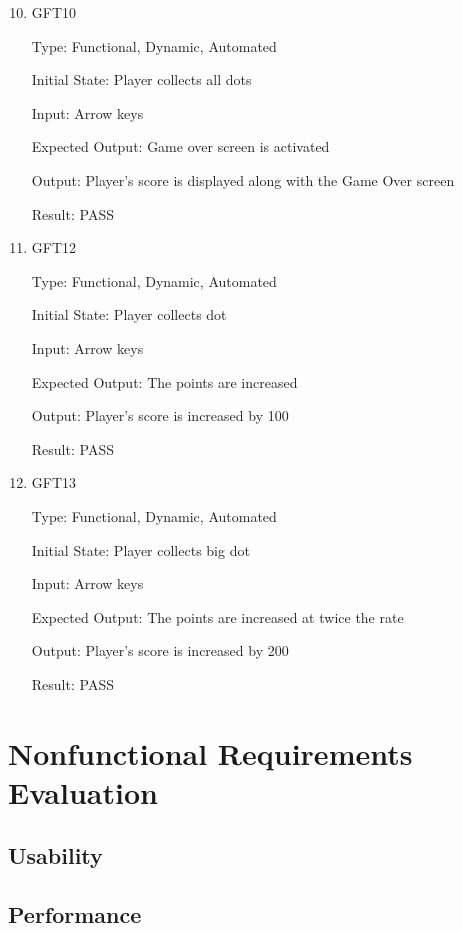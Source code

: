 \documentclass[12pt, titlepage]{article}
\begin{document}
\begin{enumerate}
\setcounter{enumi}{9}
\item{\label{gft10}{GFT10}\\}

Type: Functional, Dynamic, Automated
					
Initial State: Player collects all dots
					
Input: Arrow keys
					
Expected Output: Game over screen is activated

Output: Player's score is displayed along with the Game Over screen

Result: PASS
\setcounter{enumi}{11}
\item{\label{gft12}{GFT12}\\}

Type: Functional, Dynamic, Automated
					
Initial State: Player collects dot
					
Input: Arrow keys
					
Expected Output: The points are increased

Output: Player's score is increased by 100

Result: PASS

\item{\label{gft13}{GFT13}\\}

Type: Functional, Dynamic, Automated
					
Initial State: Player collects big dot
					
Input: Arrow keys
					
Expected Output: The points are increased at twice the rate

Output: Player's score is increased by 200

Result: PASS

\end{enumerate}

\section{Nonfunctional Requirements Evaluation}

\subsection{Usability}
		
\subsection{Performance}
\end{document}
